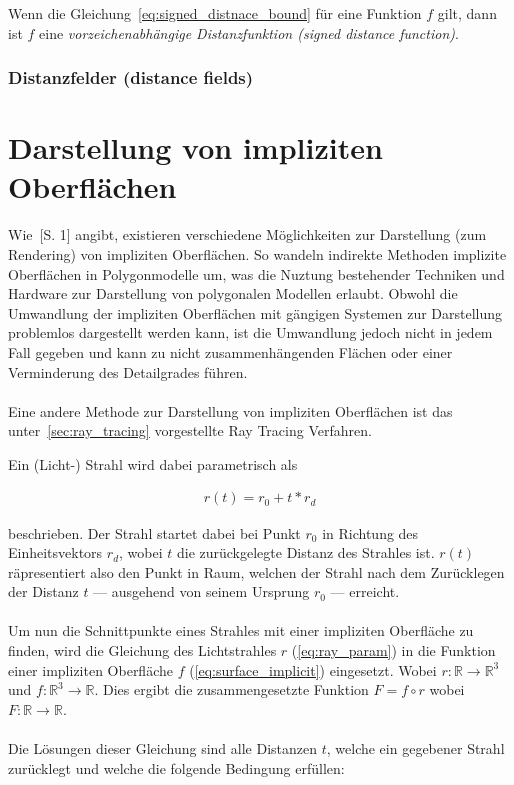 Wenn die Gleichung~\ref{eq:signed_distnace_bound} für eine Funktion $f$ gilt,
dann ist $f$ eine \textit{vorzeichenabhängige Distanzfunktion (signed distance
    function)}.

\subsubsection{Distanzfelder (distance fields)}
\label{ssubsec:distance_fields}


\section{Darstellung von impliziten Oberflächen}
\label{sec:rendering_implicit_surfaces}

Wie~\cite{hart_sphere_1994}[S. 1] angibt, existieren verschiedene Möglichkeiten
zur Darstellung (zum Rendering) von impliziten Oberflächen. So wandeln
indirekte Methoden implizite Oberflächen in Polygonmodelle um, was die Nuztung
bestehender Techniken und Hardware zur Darstellung von polygonalen Modellen
erlaubt. Obwohl die Umwandlung der impliziten Oberflächen mit gängigen Systemen
zur Darstellung problemlos dargestellt werden kann, ist die Umwandlung jedoch nicht
in jedem Fall gegeben und kann zu nicht zusammenhängenden Flächen oder einer
Verminderung des Detailgrades führen.\\
\\
Eine andere Methode zur Darstellung von impliziten Oberflächen ist das
unter~\ref{sec:ray_tracing} vorgestellte Ray Tracing Verfahren.

Ein (Licht-) Strahl wird dabei parametrisch als

\begin{gather}\label{eq:ray_param}
    r(t) = r_{0} + t * r_{d}
\end{gather}

beschrieben. Der Strahl startet dabei bei Punkt $r_{0}$ in Richtung des
Einheitsvektors $r_{d}$, wobei $t$ die zurückgelegte Distanz des Strahles ist.
$r(t)$ räpresentiert also den Punkt in Raum, welchen der Strahl nach dem
Zurücklegen der Distanz $t$ --- ausgehend von seinem Ursprung $r_{0}$ ---
erreicht.\\
\\
Um nun die Schnittpunkte eines Strahles mit einer impliziten Oberfläche zu finden, wird die Gleichung des Lichtstrahles $r$ (\ref{eq:ray_param}) in die Funktion einer impliziten Oberfläche $f$ (\ref{eq:surface_implicit}) eingesetzt. Wobei $r : \mathbb{R} \to \mathbb{R}^{3}$ und $f : \mathbb{R}^{3} \to \mathbb{R}$. Dies ergibt die zusammengesetzte Funktion $F = f \circ r$ wobei $F : \mathbb{R} \to \mathbb{R}$.\\
\\
Die Lösungen dieser Gleichung sind alle Distanzen $t$, welche ein gegebener Strahl zurücklegt und welche die folgende Bedingung erfüllen:


